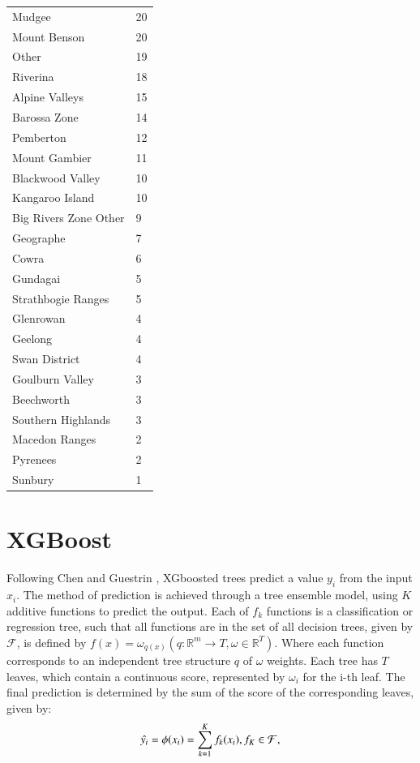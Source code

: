 \documentclass[review,12pt,authoryear]{elsarticle}
\begin{document}
\begin{linenumbers}
\begin{table}[]
\begin{tabular}{@{}ll@{}}
  Mudgee & 20 \\
  Mount Benson & 20 \\
  Other & 19 \\
  Riverina & 18 \\
  Alpine Valleys & 15 \\
  Barossa Zone & 14 \\
  Pemberton & 12 \\
  Mount Gambier & 11 \\
  Blackwood Valley & 10 \\
  Kangaroo Island & 10 \\
  Big Rivers Zone Other & 9 \\
  Geographe & 7 \\
  Cowra & 6 \\
  Gundagai & 5 \\
  Strathbogie Ranges & 5 \\
  Glenrowan & 4 \\
  Geelong & 4 \\
  Swan District & 4 \\
  Goulburn Valley & 3 \\
  Beechworth & 3 \\
  Southern Highlands & 3 \\
  Macedon Ranges & 2 \\
  Pyrenees & 2 \\
  Sunbury & 1 \\ \bottomrule
  \end{tabular}
  \end{table}


\section{XGBoost}
Following Chen and Guestrin \citep{chenXGBoostScalableTree2016}, XGboosted trees predict a value $y_i$ from the input $x_i$. The method of prediction is achieved through a tree ensemble model, using $K$ additive functions to predict the output. Each of $f_k$ functions is a classification or regression tree, such that all functions are in the set of all decision trees, given by $\mathcal{F}$, is defined by ${f(x) = \omega_{q(x)}}(q : \mathbb{R}^m \rightarrow T, \omega \in \mathbb{R}^T)$. Where each function corresponds to an independent tree structure $q$ of $\omega$ weights. Each tree has $T$ leaves, which contain a continuous score, represented by $\omega_i$ for the i-th leaf. The final prediction is determined by the sum of the score of the corresponding leaves, given by:
\begin{equation}
 \hat{y_i}=\phi(x_i)=\sum_{k=1}^{K}{f_{k}(x_{i})}, \space f_{K}\in \mathcal{F},
\end{equation}


\end{linenumbers}
\end{document}
